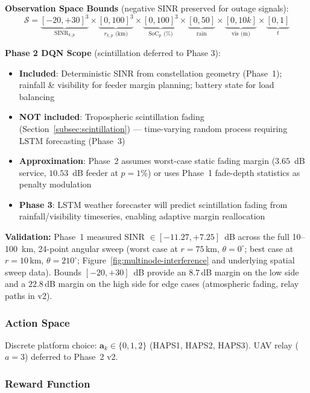 \documentclass[conference]{IEEEtran}
\begin{document}
\textbf{Observation Space Bounds} (negative SINR preserved for outage signals):
\begin{equation}
\mathcal{S} = \underbrace{[-20,+30]^3}_{\text{SINR}_{k,p}} \times \underbrace{[0,100]^3}_{r_{k,p}\text{ (km)}} \times \underbrace{[0,100]^3}_{\text{SoC}_p\text{ (\%)}} \times \underbrace{[0,50]}_{\text{rain}} \times \underbrace{[0,10k]}_{\text{vis (m)}} \times \underbrace{[0,1]}_{t}
\label{eq:obs-space}
\end{equation}

\noindent \textbf{Phase 2 DQN Scope} (scintillation deferred to Phase 3):
\begin{itemize}\setlength{\itemsep}{0pt}
  \item \textbf{Included}: Deterministic SINR from constellation geometry (Phase~1); rainfall \& visibility for feeder margin planning; battery state for load balancing
  \item \textbf{NOT included}: Tropospheric scintillation fading (Section~\ref{subsec:scintillation}) --- time-varying random process requiring LSTM forecasting (Phase~3)
  \item \textbf{Approximation}: Phase~2 assumes worst-case static fading margin ($3.65$~dB service, $10.53$~dB feeder at $p=1\%$) or uses Phase~1 fade-depth statistics as penalty modulation
  \item \textbf{Phase 3}: LSTM weather forecaster will predict scintillation fading from rainfall/visibility timeseries, enabling adaptive margin reallocation
\end{itemize}

\textbf{Validation:} Phase~1 measured SINR $\in [-11.27, +7.25]$~dB across the full 10--100~km, 24-point angular sweep (worst case at $r=75$\,km, $\theta=0^\circ$; best case at $r=10$\,km, $\theta=210^\circ$; Figure~\ref{fig:multinode-interference} and underlying spatial sweep data). Bounds $[-20, +30]$~dB provide an $8.7$\,dB margin on the low side and a $22.8$\,dB margin on the high side for edge cases (atmospheric fading, relay paths in v2).

\subsubsection{Action Space}

Discrete platform choice: $\mathbf{a}_k \in \{0, 1, 2\}$ (HAPS1, HAPS2, HAPS3). UAV relay ($a=3$) deferred to Phase~2 v2.

\subsubsection{Reward Function}
\end{document}
